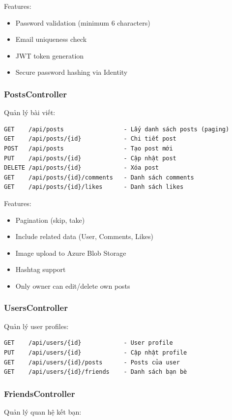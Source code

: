 Features:
\begin{itemize}
    \item Password validation (minimum 6 characters)
    \item Email uniqueness check
    \item JWT token generation
    \item Secure password hashing via Identity
\end{itemize}

\subsubsection{PostsController}
Quản lý bài viết:

\begin{verbatim}
GET    /api/posts                 - Lấy danh sách posts (paging)
GET    /api/posts/{id}            - Chi tiết post
POST   /api/posts                 - Tạo post mới
PUT    /api/posts/{id}            - Cập nhật post
DELETE /api/posts/{id}            - Xóa post
GET    /api/posts/{id}/comments   - Danh sách comments
GET    /api/posts/{id}/likes      - Danh sách likes
\end{verbatim}

Features:
\begin{itemize}
    \item Pagination (skip, take)
    \item Include related data (User, Comments, Likes)
    \item Image upload to Azure Blob Storage
    \item Hashtag support
    \item Only owner can edit/delete own posts
\end{itemize}

\subsubsection{UsersController}
Quản lý user profiles:

\begin{verbatim}
GET    /api/users/{id}            - User profile
PUT    /api/users/{id}            - Cập nhật profile
GET    /api/users/{id}/posts      - Posts của user
GET    /api/users/{id}/friends    - Danh sách bạn bè
\end{verbatim}

\subsubsection{FriendsController}
Quản lý quan hệ kết bạn:

